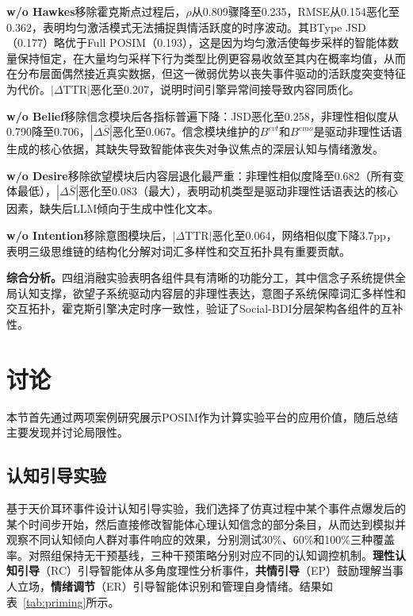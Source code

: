 \documentclass[a4paper,fleqn]{cas-dc}
\begin{document}
\textbf{w/o Hawkes}移除霍克斯点过程后，$\rho$从0.809骤降至0.235，RMSE从0.154恶化至0.362，表明均匀激活模式无法捕捉舆情活跃度的时序波动。其BType JSD（0.177）略优于Full POSIM（0.193），这是因为均匀激活使每步采样的智能体数量保持恒定，在大量均匀采样下行为类型比例更容易收敛至其内在概率均值，从而在分布层面偶然接近真实数据，但这一微弱优势以丧失事件驱动的活跃度突变特征为代价。$|\Delta\text{TTR}|$恶化至0.207，说明时间引擎异常间接导致内容同质化。

\textbf{w/o Belief}移除信念模块后各指标普遍下降：JSD恶化至0.258，非理性相似度从0.790降至0.706，$|\Delta\bar{S}|$恶化至0.067。信念模块维护的$B^{evt}$和$B^{emo}$是驱动非理性话语生成的核心依据，其缺失导致智能体丧失对争议焦点的深层认知与情绪激发。

\textbf{w/o Desire}移除欲望模块后内容层退化最严重：非理性相似度降至0.682（所有变体最低），$|\Delta\bar{S}|$恶化至0.083（最大），表明动机类型是驱动非理性话语表达的核心因素，缺失后LLM倾向于生成中性化文本。

\textbf{w/o Intention}移除意图模块后，$|\Delta\text{TTR}|$恶化至0.064，网络相似度下降3.7pp，表明三级思维链的结构化分解对词汇多样性和交互拓扑具有重要贡献。

\textbf{综合分析。}四组消融实验表明各组件具有清晰的功能分工，其中信念子系统提供全局认知支撑，欲望子系统驱动内容层的非理性表达，意图子系统保障词汇多样性和交互拓扑，霍克斯引擎决定时序一致性，验证了Social-BDI分层架构各组件的互补性。

\section{讨论}\label{sec:discussion}

本节首先通过两项案例研究展示POSIM作为计算实验平台的应用价值，随后总结主要发现并讨论局限性。

\subsection{认知引导实验}

基于天价耳环事件设计认知引导实验，我们选择了仿真过程中某个事件点爆发后的某个时间步开始，然后直接修改智能体心理认知信念的部分条目，从而达到模拟并观察不同认知倾向人群对事件响应的效果，分别测试30\%、60\%和100\%三种覆盖率。对照组保持无干预基线，三种干预策略分别对应不同的认知调控机制。\textbf{理性认知引导}（RC）引导智能体从多角度理性分析事件，\textbf{共情引导}（EP）鼓励理解当事人立场，\textbf{情绪调节}（ER）引导智能体识别和管理自身情绪。结果如表~\ref{tab:priming}所示。
\end{document}
